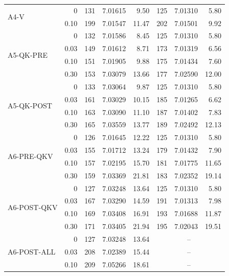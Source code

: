 \begin{longtable}{l r r r r r r r}
\midrule
\multirow{2}{*}{A4-V} & 0 & 131 & 7.01615 & 9.50 & 125 & 7.01310 & 5.80 \\*
 & 0.10 & 199 & 7.01547 & 11.47 & 202 & 7.01501 & 9.92 \\
\midrule
\multirow{4}{*}{A5-QK-PRE} & 0 & 132 & 7.01586 & 8.45 & 125 & 7.01310 & 5.80 \\*
 & 0.03 & 149 & 7.01612 & 8.71 & 173 & 7.01319 & 6.56 \\*
 & 0.10 & 151 & 7.01905 & 9.88 & 175 & 7.01434 & 7.60 \\*
 & 0.30 & 153 & 7.03079 & 13.66 & 177 & 7.02590 & 12.00 \\
\midrule
\multirow{4}{*}{A5-QK-POST} & 0 & 133 & 7.03064 & 9.87 & 125 & 7.01310 & 5.80 \\*
 & 0.03 & 161 & 7.03029 & 10.15 & 185 & 7.01265 & 6.62 \\*
 & 0.10 & 163 & 7.03090 & 11.10 & 187 & 7.01402 & 7.83 \\*
 & 0.30 & 165 & 7.03559 & 13.77 & 189 & 7.02492 & 12.13 \\
\midrule
\multirow{4}{*}{A6-PRE-QKV} & 0 & 126 & 7.01645 & 12.22 & 125 & 7.01310 & 5.80 \\*
 & 0.03 & 155 & 7.01712 & 13.24 & 179 & 7.01432 & 7.90 \\*
 & 0.10 & 157 & 7.02195 & 15.70 & 181 & 7.01775 & 11.65 \\*
 & 0.30 & 159 & 7.03369 & 21.81 & 183 & 7.02352 & 19.14 \\
\midrule
\multirow{4}{*}{A6-POST-QKV} & 0 & 127 & 7.03248 & 13.64 & 125 & 7.01310 & 5.80 \\*
 & 0.03 & 167 & 7.03290 & 14.59 & 191 & 7.01313 & 7.98 \\*
 & 0.10 & 169 & 7.03408 & 16.91 & 193 & 7.01688 & 11.87 \\*
 & 0.30 & 171 & 7.03405 & 21.94 & 195 & 7.02043 & 19.51 \\
\midrule
\multirow{3}{*}{A6-POST-ALL} & 0 & 127 & 7.03248 & 13.64 & \multicolumn{3}{c}{--} \\*
 & 0.03 & 208 & 7.02389 & 15.44 & \multicolumn{3}{c}{--} \\*
 & 0.10 & 209 & 7.05266 & 18.61 & \multicolumn{3}{c}{--} \\
\end{longtable}
\endgroup
